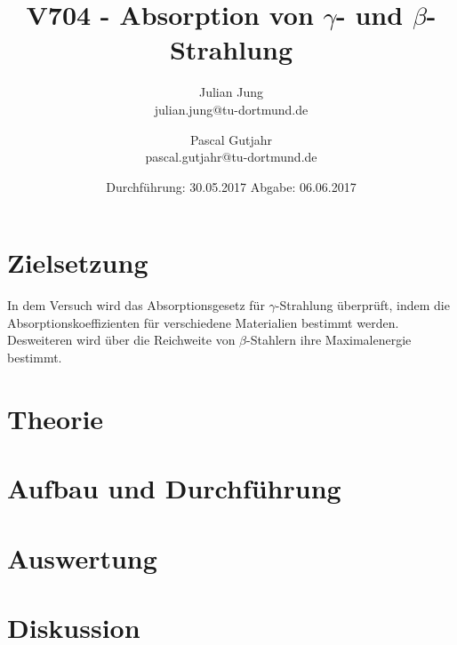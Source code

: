 

\title{V704 - Absorption von $\gamma$- und $\beta$-Strahlung}
\author{Julian Jung \\ julian.jung@tu-dortmund.de
  \and Pascal Gutjahr \\ pascal.gutjahr@tu-dortmund.de}
  \date{Durchführung: 30.05.2017
  \hspace{3em}
  Abgabe: 06.06.2017}
  
\maketitle
\newpage
\tableofcontents
\newpage
\section{Zielsetzung}
In dem Versuch wird das Absorptionsgesetz für $\gamma$-Strahlung überprüft,
indem die Absorptionskoeffizienten für verschiedene Materialien bestimmt werden.
Desweiteren wird über die Reichweite von $\beta$-Stahlern ihre Maximalenergie
bestimmt.
\section{Theorie}
 
\section{Aufbau und Durchführung}
 
\section{Auswertung}
 
\section{Diskussion}
 
\printbibliography

